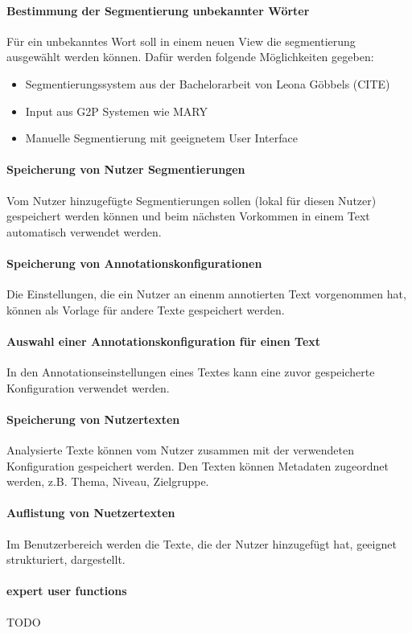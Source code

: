 \paragraph{Bestimmung der Segmentierung unbekannter Wörter}
Für ein unbekanntes Wort soll in einem neuen View die segmentierung ausgewählt werden können. Dafür werden folgende Möglichkeiten gegeben:
\begin{itemize}
	\item Segmentierungssystem aus der Bachelorarbeit von Leona Göbbels (CITE)
	\item Input aus G2P Systemen wie MARY
	\item Manuelle Segmentierung mit geeignetem User Interface
\end{itemize}

\paragraph{Speicherung von Nutzer Segmentierungen}
Vom Nutzer hinzugefügte Segmentierungen sollen (lokal für diesen Nutzer) gespeichert werden können und beim nächsten Vorkommen in einem Text automatisch verwendet werden.

\paragraph{Speicherung von Annotationskonfigurationen}
Die Einstellungen, die ein Nutzer an einenm annotierten Text vorgenommen hat, können als Vorlage für andere Texte gespeichert werden.

\paragraph{Auswahl einer Annotationskonfiguration für einen Text}
In den Annotationseinstellungen eines Textes kann eine zuvor gespeicherte Konfiguration verwendet werden.

\paragraph{Speicherung von Nutzertexten}
Analysierte Texte können vom Nutzer zusammen mit der verwendeten Konfiguration gespeichert werden. Den Texten können Metadaten zugeordnet werden, z.B. Thema, Niveau, Zielgruppe.

\paragraph{Auflistung von Nuetzertexten}
Im Benutzerbereich werden die Texte, die der Nutzer hinzugefügt hat, geeignet strukturiert, dargestellt.

\paragraph{expert user functions}
TODO
